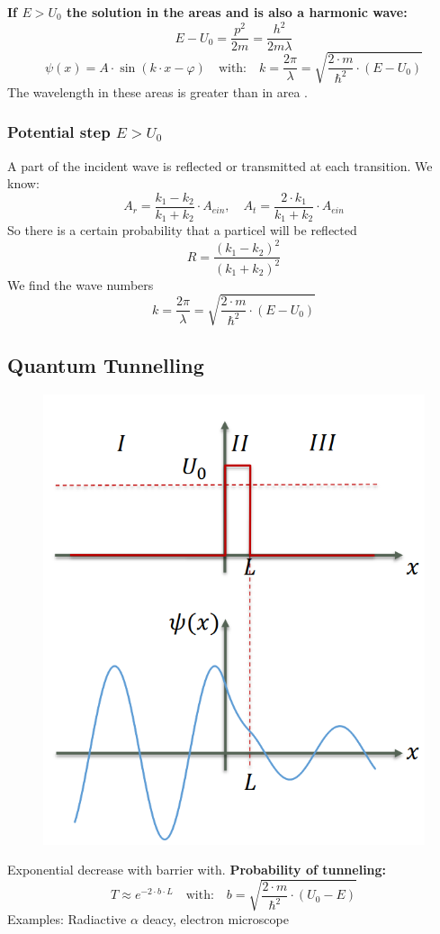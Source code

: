 \textbf{If \(E > U_0\) the solution in the areas  and  is also a harmonic wave:}
\[
E - U_0 = \frac{p^2}{2m} = \frac{h^2}{2m\lambda}
\]
\begin{equation*}
    \psi(x) = A\cdot \sin(k\cdot x-\varphi)\quad\text{with:}\quad k= \frac{2\pi}{\lambda} = \sqrt{\frac{2\cdot m}{\hbar^2}\cdot(E-U_0)}
\end{equation*}
The wavelength in these areas is greater than in area .
\subsubsection{Potential step \(E > U_0\)}
A part of the incident wave is reflected or transmitted at each transition. We know:
\begin{equation*}
    A_r = \frac{k_1 - k_2}{k_1 + k_2}\cdot A_{ein}, \quad A_t = \frac{2\cdot k_1}{k_1 + k_2} \cdot A_{ein}
\end{equation*}
So there is a certain probability that a particel will be reflected
\begin{equation*}
    R = \frac{(k_1 -k_2)^2}{(k_1 + k_2)^2}
\end{equation*}
We find the wave numbers
\begin{equation*}
    k = \frac{2\pi}{\lambda} = \sqrt{\frac{2 \cdot m}{\hbar^2}\cdot (E-U_0)}
\end{equation*}
\subsection{Quantum Tunnelling}
\begin{figure}[h]
    \centering
    \includegraphics[width=0.4\columnwidth]{images/tunnel.png}
    \label{fig:tunnel}
\end{figure}
Exponential decrease with barrier with. \textbf{Probability of tunneling:}
\begin{equation*}
    T \approx e^{-2\cdot b\cdot L} \quad\text{with:}\quad b = \sqrt{\frac{2\cdot m}{\hbar^2}\cdot (U_0 - E)}
\end{equation*}
Examples: Radiactive \(\alpha\) deacy, electron microscope
